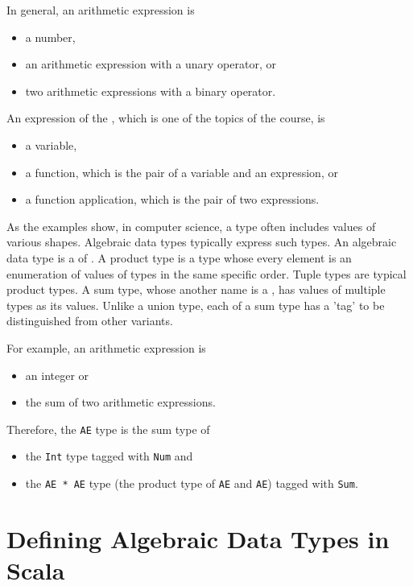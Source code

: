 In general, an arithmetic expression is

\begin{itemize}
\item a number,
\item an arithmetic expression with a unary operator, or
\item two arithmetic expressions with a binary operator.
\end{itemize}

An expression of the  , which is one of the topics of
the course, is

\begin{itemize}
\item a variable,
\item a function, which is the pair of a variable and an expression, or
\item a function application, which is the pair of two expressions.
\end{itemize}

As the examples show, in computer science, a type often includes values of
various shapes. Algebraic data types typically express such types. An algebraic
data type is a   of  . A product
type is a type whose every element is an enumeration of values of types in the
same specific order. Tuple types are typical product types. A sum type, whose
another name is a   , has values of multiple
types as its values. Unlike a union type, each  of a sum type has a
'tag' to be distinguished from other variants.

For example, an arithmetic expression is

\begin{itemize}
\item an integer or
\item the sum of two arithmetic expressions.
\end{itemize}

Therefore, the \verb!AE! type is the sum type of

\begin{itemize}
\item the \verb!Int! type tagged with \verb!Num! and
\item the \verb!AE * AE! type (the product type of \verb!AE! and \verb!AE!) tagged
with \verb!Sum!.
\end{itemize}

\section{Defining Algebraic Data Types in Scala}

